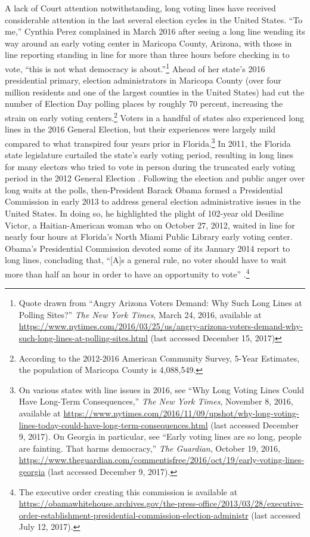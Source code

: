 \documentclass[12pt,titlepage]{article}
\begin{document}
A lack of Court attention notwithstanding, long voting lines have
received considerable attention in the last several election cycles in
the United States.  ``To me,'' Cynthia Perez complained in March 2016
after seeing a long line wending its way around an early voting center
in Maricopa County, Arizona, with those in line reporting standing in
line for more than three hours before checking in to vote, ``this is
not what democracy is about.''\footnote{Quote drawn from ``Angry
  Arizona Voters Demand: Why Such Long Lines at Polling Sites?''
  \emph{The New York Times}, March 24, 2016, available at
  \url{https://www.nytimes.com/2016/03/25/us/angry-arizona-voters-demand-why-such-long-lines-at-polling-sites.html}
  (last accessed December 15, 2017)} Ahead of her state's 2016
presidential primary, election administrators in Maricopa County (over
four million residents and one of the largest counties in the United
States) had cut the number of Election Day polling places by roughly
70 percent, increasing the strain on early voting
centers.\footnote{According to the 2012-2016 American Community
  Survey, 5-Year Estimates, the population of Maricopa County is
  4,088,549.}  Voters in a handful of states also experienced long
lines in the 2016 General Election, but their experiences were largely
mild compared to what transpired four years prior in
Florida.\footnote{On various states with line issues in 2016, see
  ``Why Long Voting Lines Could Have Long-Term Consequences,''
  \emph{The New York Times}, November 8, 2016, available at
  \url{https://www.nytimes.com/2016/11/09/upshot/why-long-voting-lines-today-could-have-long-term-consequences.html}
  (last accessed December 9, 2017).  On Georgia in particular, see
  ``Early voting lines are so long, people are fainting. That harms
  democracy,'' \emph{The Guardian}, October 19, 2016,
  \url{https://www.theguardian.com/commentisfree/2016/oct/19/early-voting-lines-georgia}
  (last accessed December 9, 2017).} In 2011, the Florida state
legislature curtailed the state's early voting period, resulting in
long lines for many electors who tried to vote in person during the
truncated early voting period in the 2012 General Election
\citep{herron_smith2014}. Following the election and public anger over
long waits at the polls, then-President Barack Obama formed a
Presidential Commission in early 2013 to address general election
administrative issues in the United States. In doing so, he
highlighted the plight of 102-year old Desiline Victor, a
Haitian-American woman who on October 27, 2012, waited in line for
nearly four hours at Florida's North Miami Public Library early voting
center. Obama's Presidential Commission devoted some of its January
2014 report to long lines, concluding that, ``[A]s a general rule, no
voter should have to wait more than half an hour in order to have an
opportunity to vote'' \citep[p.\ 13,][]{pcea:2014}.\footnote{The
  executive order creating this commission is available at
  \url{https://obamawhitehouse.archives.gov/the-press-office/2013/03/28/executive-order-establishment-presidential-commission-election-administr}
  (last accessed July 12, 2017).}
\end{document}
